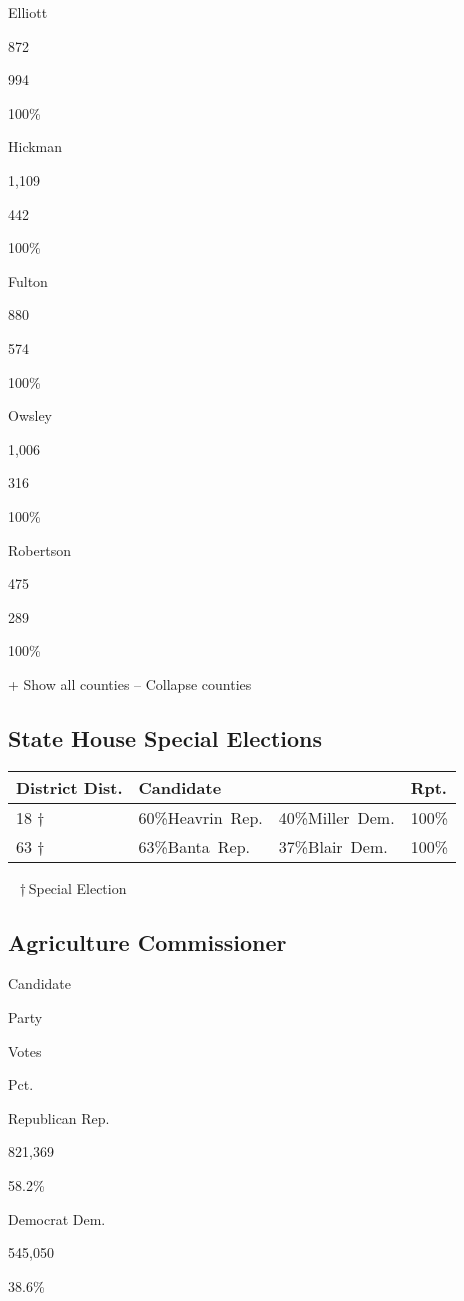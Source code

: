Elliott

872

994

100\%

Hickman

1,109

442

100\%

Fulton

880

574

100\%

Owsley

1,006

316

100\%

Robertson

475

289

100\%

+ Show all counties -- Collapse counties

\hypertarget{state-house-special-elections}{%
\subsection{State House Special
Elections}\label{state-house-special-elections}}

\begin{longtable}[]{@{}llll@{}}
\toprule
District Dist. & Candidate & & Rpt.\tabularnewline
\midrule
\endhead
18 † & 60\%Heavrin~Rep. & 40\%Miller~Dem. & 100\%\tabularnewline
63 † & 63\%Banta~Rep. & 37\%Blair~Dem. & 100\%\tabularnewline
\bottomrule
\end{longtable}

~ † Special Election

\hypertarget{agriculture-commissioner}{%
\subsection{Agriculture Commissioner}\label{agriculture-commissioner}}

Candidate

Party

Votes

Pct.

Republican Rep.

821,369

58.2\%

Democrat Dem.

545,050

38.6\%

